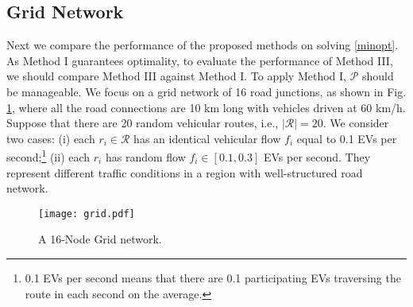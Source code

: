 \documentclass[journal]{IEEEtran}
\begin{document}
\subsection{Grid Network} \label{gridNetwork}
Next we compare the performance of the proposed methods on solving \eqref{minopt}. As Method I guarantees optimality, to evaluate the performance of Method III, we should compare Method III against Method I. To apply Method I, $\mathcal{P}$ should be manageable. We focus on a grid network of 16 road junctions, as shown in Fig. \ref{fig:grid}, where all the road connections are 10 km long with vehicles driven at 60 km/h. Suppose that there are 20 random vehicular routes, i.e., $|\mathcal{R}|=20$. We consider two cases: (i) each $r_i\in\mathcal{R}$ has an identical vehicular flow $f_i$ equal to 0.1 EVs per second;\footnote{0.1 EVs per second means that there are 0.1 participating EVs traversing the route in each second on the average.} (ii) each  $r_i$ has random flow $f_i\in[0.1,0.3]$ EVs per second. They represent different traffic conditions in a region with well-structured road network.

\begin{figure}[!t]
\centering
\texttt{[image: grid.pdf]}
\caption{A 16-Node Grid network.}
\label{fig:grid}
\end{figure}
\end{document}
